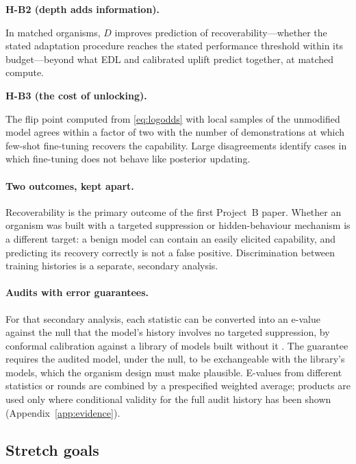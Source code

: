 \documentclass[11pt,a4paper]{article}
\newenvironment{hypbox}[1]{%
  \def\FrameCommand{{\color{chyp}\vrule width 1.6pt}\hspace{8pt}}%
  \MakeFramed{\advance\hsize-\width\FrameRestore}%
  \noindent\textbf{#1}\par\smallskip\noindent\ignorespaces}{\endMakeFramed}
\begin{document}
\begin{hypbox}{H-B2 (depth adds information).}
In matched organisms, $D$ improves prediction of recoverability---whether the stated adaptation procedure reaches the stated performance threshold within its budget---beyond what EDL and calibrated uplift predict together, at matched compute.
\end{hypbox}

\begin{hypbox}{H-B3 (the cost of unlocking).}
The flip point computed from \eqref{eq:logodds} with local samples of the
unmodified model agrees within a factor of two with the number of
demonstrations at which few-shot fine-tuning recovers the capability.
Large disagreements identify cases in which fine-tuning does not behave
like posterior updating.
\end{hypbox}

\paragraph{Two outcomes, kept apart.} Recoverability is the primary outcome of
the first Project~B paper. Whether an organism was built with a targeted
suppression or hidden-behaviour mechanism is a different target: a benign
model can contain an easily elicited capability, and predicting its
recovery correctly is not a false positive. Discrimination between training
histories is a separate, secondary analysis.

\paragraph{Audits with error guarantees.} For that secondary analysis, each
statistic can be converted into an e-value against the null that the
model's history involves no targeted suppression, by conformal calibration
against a library of models built without it \cite{vovk2005}. The
guarantee requires the audited model, under the null, to be exchangeable
with the library's models, which the organism design must make plausible.
E-values from different statistics or rounds are combined by a prespecified
weighted average; products are used only where conditional validity for
the full audit history has been shown (Appendix~\ref{app:evidence}).

\subsection{Stretch goals}
\label{sec:emcase}
\end{document}
